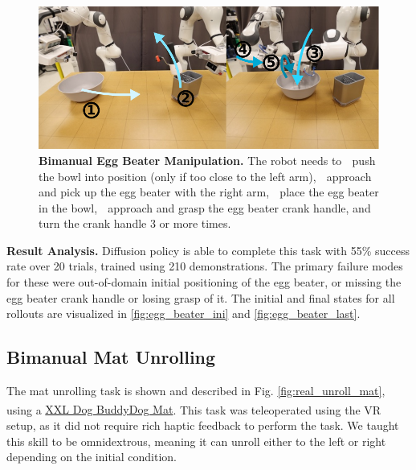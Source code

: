 \documentclass[Afour,sageh,times]{sagej}
\newcommand{\legalTM}{\textsuperscript{\texttrademark}}
\begin{document}
\begin{figure}[t]
\centering
\includegraphics[width=\linewidth]{figure/real_egg_beater_setup_compressed.pdf}
\caption{\textbf{Bimanual Egg Beater Manipulation. }
\label{fig:real_egg_beater}
The robot needs to
\textcircled{} push the bowl into position (only if too close to the left arm),
\textcircled{} approach and pick up the egg beater with the right arm,
\textcircled{} place the egg beater in the bowl,
\textcircled{} approach and grasp the egg beater crank handle, and
\textcircled{} turn the crank handle 3 or more times.
}
\vspace{-4mm}
\end{figure}

\textbf{Result Analysis.} Diffusion policy is able to complete this task with 55\% success rate over 20 trials, trained using 210 demonstrations. The primary failure modes for these were out-of-domain initial positioning of the egg beater, or missing the egg beater crank handle or losing grasp of it. The initial and final states for all rollouts are visualized in \ref{fig:egg_beater_ini} and \ref{fig:egg_beater_last}.



\subsection{Bimanual Mat Unrolling}

The mat unrolling task is shown and described in Fig. \ref{fig:real_unroll_mat}, using a
\href{https://www.amazon.com/DogBuddy-Dog-Food-Mat-Waterproof/dp/B08GGDNB71}{XXL Dog Buddy\legalTM Dog Mat}.
This task was teleoperated using the VR setup, as it did not require rich haptic feedback to perform the task. We taught this skill to be omnidextrous, meaning it can unroll either to the left or right depending on the initial condition.
\end{document}

